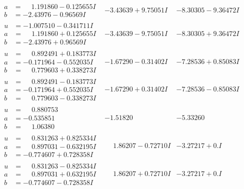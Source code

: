 \documentclass[1p]{elsarticle_modified}
\theoremstyle{definition}
\begin{document}
$$\begin{array}{c|c|c}
\begin{aligned}
a &= \phantom{-}1.191860 - 0.125655 I \\
b &= -2.43976 - 0.96569 I\end{aligned}
 & -3.43639 + 9.75051 I & -8.30305 - 9.36472 I \\ \hline\begin{aligned}
u &= -1.007510 - 0.341711 I \\
a &= \phantom{-}1.191860 + 0.125655 I \\
b &= -2.43976 + 0.96569 I\end{aligned}
 & -3.43639 - 9.75051 I & -8.30305 + 9.36472 I \\ \hline\begin{aligned}
u &= \phantom{-}0.892491 + 0.183773 I \\
a &= -0.171964 - 0.552035 I \\
b &= \phantom{-}0.779603 + 0.338273 I\end{aligned}
 & -1.67290 - 0.31402 I & -7.28536 + 0.85083 I \\ \hline\begin{aligned}
u &= \phantom{-}0.892491 - 0.183773 I \\
a &= -0.171964 + 0.552035 I \\
b &= \phantom{-}0.779603 - 0.338273 I\end{aligned}
 & -1.67290 + 0.31402 I & -7.28536 - 0.85083 I \\ \hline\begin{aligned}
u &= \phantom{-}0.880753\phantom{ +0.000000I} \\
a &= -0.535851\phantom{ +0.000000I} \\
b &= \phantom{-}1.06380\phantom{ +0.000000I}\end{aligned}
 & -1.51820\phantom{ +0.000000I} & -5.33260\phantom{ +0.000000I} \\ \hline\begin{aligned}
u &= \phantom{-}0.831263 + 0.825334 I \\
a &= \phantom{-}0.897031 - 0.632195 I \\
b &= -0.774607 + 0.728358 I\end{aligned}
 & \phantom{-}1.86207 - 0.72710 I & -3.27217 + 0. I\phantom{ +0.000000I} \\ \hline\begin{aligned}
u &= \phantom{-}0.831263 - 0.825334 I \\
a &= \phantom{-}0.897031 + 0.632195 I \\
b &= -0.774607 - 0.728358 I\end{aligned}
 & \phantom{-}1.86207 + 0.72710 I & -3.27217 + 0. I\phantom{ +0.000000I} \\ \hline\begin{aligned}

\end{aligned}
\end{array}$$
\end{document}

